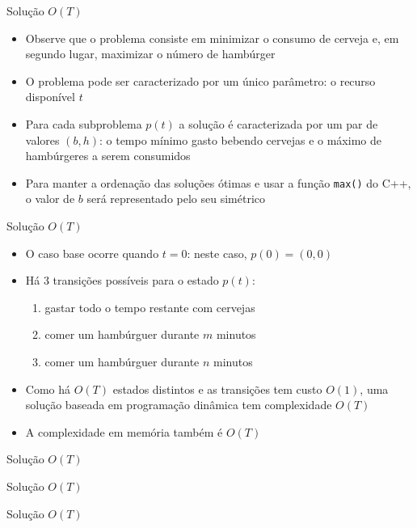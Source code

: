 \begin{frame}[fragile]{Solução $O(T)$}

    \begin{itemize}
        \item Observe que o problema consiste em minimizar o consumo de cerveja e, em segundo lugar,
            maximizar o número de hambúrger

        \item O problema pode ser caracterizado por um único parâmetro: o recurso disponível
            $t$
        
        \item Para cada subproblema $p(t)$ a solução é caracterizada por um par de valores
            $(b, h)$: o tempo mínimo gasto bebendo cervejas e o máximo de hambúrgeres a serem consumidos 

        \item Para manter a ordenação das soluções ótimas e usar a função \texttt{max()} do 
            C++, o valor de $b$ será representado pelo seu simétrico
   \end{itemize}

\end{frame}

\begin{frame}[fragile]{Solução $O(T)$}

    \begin{itemize}
        \item O caso base ocorre quando $t = 0$: neste caso, $p(0) = (0, 0)$
            
        \item Há 3 transições possíveis para o estado $p(t)$:

        \begin{enumerate}
            \item gastar todo o tempo restante com cervejas
            \item comer um hambúrguer durante $m$ minutos
            \item comer um hambúrguer durante $n$ minutos
        \end{enumerate}

        \item Como há $O(T)$ estados distintos e as transições tem custo $O(1)$, uma solução
            baseada em programação dinâmica tem complexidade $O(T)$

        \item A complexidade em memória também é $O(T)$
   \end{itemize}

\end{frame}

\begin{frame}[fragile]{Solução $O(T)$}
\end{frame}

\begin{frame}[fragile]{Solução $O(T)$}
\end{frame}

\begin{frame}[fragile]{Solução $O(T)$}
\end{frame}
